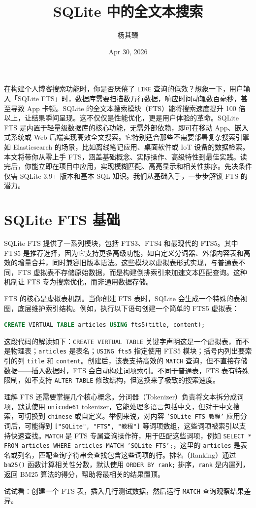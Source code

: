 \title{SQLite 中的全文本搜索}
\author{杨其臻}
\date{Apr 30, 2026}
\maketitle
在构建个人博客搜索功能时，你是否厌倦了 \texttt{LIKE} 查询的低效？想象一下，用户输入「SQLite FTS」时，数据库需要扫描数万行数据，响应时间动辄数百毫秒，甚至导致 App 卡顿。SQLite 的全文本搜索模块（FTS）能将搜索速度提升 100 倍以上，让结果瞬间呈现。这不仅仅是性能优化，更是用户体验的革命。SQLite FTS 是内置于轻量级数据库的核心功能，无需外部依赖，即可在移动 App、嵌入式系统或 Web 后端实现高效全文搜索。它特别适合那些不需要部署复杂搜索引擎如 Elasticsearch 的场景，比如离线笔记应用、桌面软件或 IoT 设备的数据检索。本文将带你从零上手 FTS，涵盖基础概念、实际操作、高级特性到最佳实践。读完后，你能立即在项目中应用，实现模糊匹配、高亮显示和相关性排序。先决条件仅需 SQLite 3.9+ 版本和基本 SQL 知识。我们从基础入手，一步步解锁 FTS 的潜力。\par
\chapter{SQLite FTS 基础}
SQLite FTS 提供了一系列模块，包括 FTS3、FTS4 和最现代的 FTS5。其中 FTS5 是推荐选择，因为它支持更多高级功能，如自定义分词器、外部内容表和高效的增量合并，同时兼容旧版本语法。这些模块以虚拟表形式实现，与普通表不同，FTS 虚拟表不存储原始数据，而是构建倒排索引来加速文本匹配查询。这种机制让 FTS 专为搜索优化，而非通用数据存储。\par
FTS 的核心是虚拟表机制。当你创建 FTS 表时，SQLite 会生成一个特殊的表视图，底层维护索引结构。例如，执行以下语句创建一个简单的 FTS5 虚拟表：\par
\begin{lstlisting}[language=sql]
CREATE VIRTUAL TABLE articles USING fts5(title, content);
\end{lstlisting}
这段代码的解读如下：\texttt{CREATE VIRTUAL TABLE} 关键字声明这是一个虚拟表，而不是物理表；\texttt{articles} 是表名；\texttt{USING fts5} 指定使用 FTS5 模块；括号内列出要索引的列 \texttt{title} 和 \texttt{content}。创建后，该表支持高效的 \texttt{MATCH} 查询，但不直接存储数据——插入数据时，FTS 会自动构建词项索引。不同于普通表，FTS 表有特殊限制，如不支持 \texttt{ALTER TABLE} 修改结构，但这换来了极致的搜索速度。\par
理解 FTS 还需要掌握几个核心概念。分词器（Tokenizer）负责将文本拆分成词项，默认使用 \texttt{unicode61} tokenizer，它能处理多语言包括中文，但对于中文搜索，可切换到 \texttt{chinese} 或自定义。举例来说，对内容 \texttt{'SQLite FTS 教程'} 应用分词后，可能得到 \texttt{["SQLite", "FTS", "教程"]} 等词项数组，这些词项被索引以支持快速查找。\texttt{MATCH} 是 FTS 专属查询操作符，用于匹配这些词项，例如 \texttt{SELECT * FROM articles WHERE articles MATCH 'SQLite FTS';}，这里的 \texttt{articles} 是表名或列名，匹配查询字符串会查找包含这些词项的行。排名（Ranking）通过 \texttt{bm25()} 函数计算相关性分数，默认使用 \texttt{ORDER BY rank;} 排序，\texttt{rank} 是内置列，返回 BM25 算法的得分，帮助将最相关的结果置顶。\par
试试看：创建一个 FTS 表，插入几行测试数据，然后运行 \texttt{MATCH} 查询观察结果差异。\par
